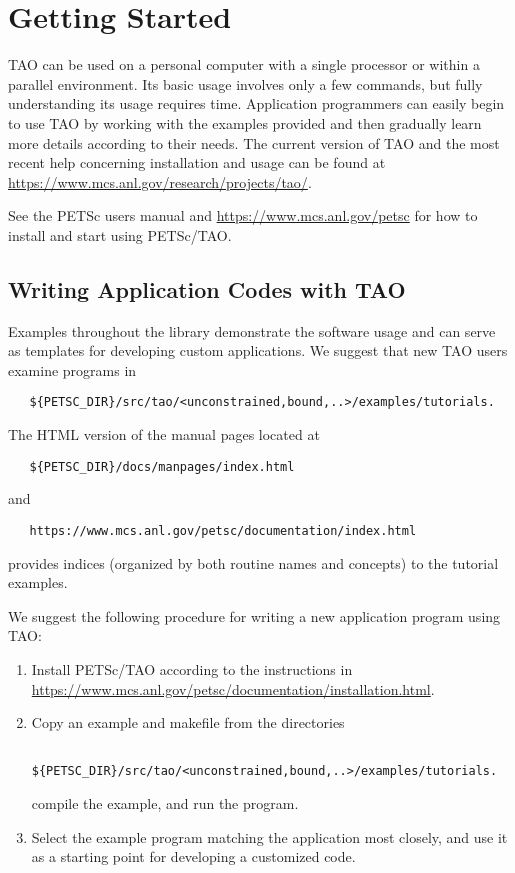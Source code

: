 \chapter{Getting Started}
\label{chapter:intro_tao}

TAO can be used on a personal
computer with a single processor or within a parallel environment.  
Its basic usage involves only a few commands, but fully 
understanding its usage requires time.
Application programmers can easily begin to use TAO by working with 
the examples provided and then gradually learn more details according to
their needs.  The current version of TAO and the most recent help 
concerning installation and usage can be found at  
\url{https://www.mcs.anl.gov/research/projects/tao/}.

See the PETSc users manual and \url{https://www.mcs.anl.gov/petsc} for how to install and start using PETSc/TAO.

\section{Writing Application Codes with TAO}

Examples throughout the library demonstrate the software usage and
can serve as templates for developing custom applications.  We suggest
that new TAO users examine programs in
\begin{verbatim}
   ${PETSC_DIR}/src/tao/<unconstrained,bound,..>/examples/tutorials.
\end{verbatim} 
The HTML version of the manual pages located at
\begin{verbatim}
   ${PETSC_DIR}/docs/manpages/index.html
\end{verbatim} %
\noindent
and
\begin{verbatim}
   https://www.mcs.anl.gov/petsc/documentation/index.html
\end{verbatim}
\noindent
provides indices (organized by both routine names and concepts) to the
tutorial examples.

We suggest the following procedure for writing a new application
program using TAO:

\begin{enumerate}
\item Install PETSc/TAO according to the instructions in
  \url{https://www.mcs.anl.gov/petsc/documentation/installation.html}.
\item Copy an example and makefile from the directories
\begin{verbatim}
   ${PETSC_DIR}/src/tao/<unconstrained,bound,..>/examples/tutorials.
\end{verbatim} 
  compile the example, and run the program. 
\item Select the example program matching the application most
  closely, and use it as a starting point for developing a customized
  code.
\end{enumerate}

